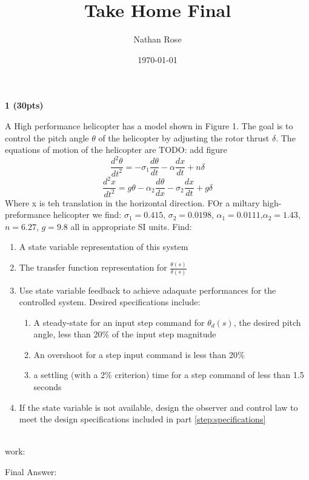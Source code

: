 \documentclass[11pt]{article}
\title{Take Home Final}
\author{Nathan Rose}
\date{\today}
\newcommand\question[5]{
  
  \textbf{\Large{#1 (#2)\\}}
  \large{#3\phantom{.}}\\
  work:
  #4\phantom{.}

  \finalAnswer{#5}\phantom{.}
}
\newcommand\finalAnswer[1]{
  \large{
  Final Answer:
  
  #1
  }  
}
\newcommand{\TODO}[1]{{\LARGE \color{red} TODO: #1}}
\begin{document}
\maketitle
\question{1}{30pts}{
  A High performance helicopter has a model shown in Figure 1. The goal is to control the pitch angle $\theta$
  of the helicopter by adjusting the rotor thrust $\delta$. The equations of motion of the helicopter are
  \TODO{add figure}
  \begin{equation}
    \frac {d^2\theta}{dt^2} = -\sigma_1 \frac{d\theta}{dt} - \alpha \frac{dx}{dt} +n\delta
  \end{equation}
  \begin{equation}
    \frac{d^2x}{dt^2} = g\theta - \alpha_2 \frac{d\theta}{dx} - \sigma_2 \frac{dx}{dt} + g\delta
  \end{equation}
  Where x is teh translation in the horizontal direction. FOr a miltary high-preformance helicopter we find:
  $\sigma_1 = 0.415$, $\sigma_2 = 0.0198$, $\alpha_1 = 0.0111$,$\alpha_2 = 1.43$, $n=6.27$, $g=9.8$ all in
  appropriate SI units.
  Find:
  \begin{enumerate}[(\alph*)]
  \item A state variable representation of this system
  \item The transfer function representation for $\frac{\theta(s)}{\delta(s)}$
  \item Use state variable feedback to achieve adaquate performances for the controlled system.
    Desired specifications include:\label{step:specifications}
    \begin{enumerate}[(\arabic*)]
    \item A steady-state for an input step command for $\theta_d(s)$, the desired pitch angle, less than
      20\% of the input step magnitude
    \item An overshoot for a step input command is less than 20\%
    \item a settling (with a 2\% criterion) time for a step command of less than 1.5 seconds
    \end{enumerate}
  \item If the state variable is not available, design the observer and control law to meet the design
    specifications included in part \ref{step:specifications}
  \end{enumerate}
}{}{}
\end{document}
